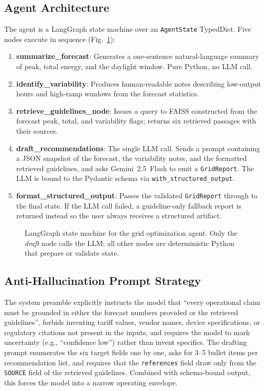 \documentclass[journal,onecolumn,11pt]{IEEEtran}
\begin{document}
\subsection{Agent Architecture}
The agent is a LangGraph state machine over an \texttt{AgentState} TypedDict. Five nodes execute in sequence (Fig.~\ref{fig:graph}):

\begin{enumerate}
  \item \textbf{summarize\_forecast}: Generates a one-sentence natural-language summary of peak, total energy, and the daylight window. Pure Python, no LLM call.
  \item \textbf{identify\_variability}: Produces human-readable notes describing low-output hours and high-ramp windows from the forecast statistics.
  \item \textbf{retrieve\_guidelines\_node}: Issues a query to FAISS constructed from the forecast peak, total, and variability flags; returns six retrieved passages with their sources.
  \item \textbf{draft\_recommendations}: The single LLM call. Sends a prompt containing a JSON snapshot of the forecast, the variability notes, and the formatted retrieved guidelines, and asks Gemini~2.5~Flash to emit a \texttt{GridReport}. The LLM is bound to the Pydantic schema via \texttt{with\_structured\_output}.
  \item \textbf{format\_structured\_output}: Passes the validated \texttt{GridReport} through to the final state. If the LLM call failed, a guideline-only fallback report is returned instead so the user always receives a structured artifact.
\end{enumerate}

\begin{figure}[ht]
\centering
{}
\caption{LangGraph state machine for the grid optimization agent. Only the \emph{draft} node calls the LLM; all other nodes are deterministic Python that prepare or validate state.}
\label{fig:graph}
\end{figure}

\subsection{Anti-Hallucination Prompt Strategy}
The system preamble explicitly instructs the model that ``every operational claim must be grounded in either the forecast numbers provided or the retrieved guidelines'', forbids inventing tariff values, vendor names, device specifications, or regulatory citations not present in the inputs, and requires the model to mark uncertainty (e.g., ``confidence low'') rather than invent specifics. The drafting prompt enumerates the six target fields one by one, asks for 3--5 bullet items per recommendation list, and requires that the \texttt{references} field draw only from the \texttt{SOURCE} field of the retrieved guidelines. Combined with schema-bound output, this forces the model into a narrow operating envelope.
\end{document}
